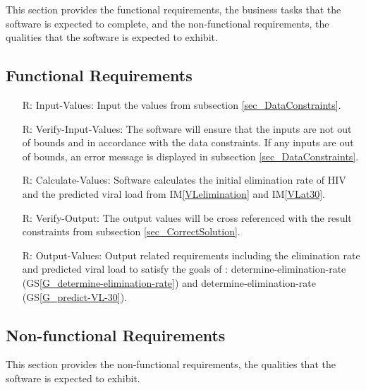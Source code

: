 \documentclass[12pt]{article}
\newcommand{\iref}[1]{IM\ref{#1}}
\newcounter{reqnum} %
\begin{document}
This section provides the functional requirements, the business tasks that the
software is expected to complete, and the non-functional requirements, the
qualities that the software is expected to exhibit.

\subsection{Functional Requirements}
\label{sec_FunctionalReq}

\noindent \begin{itemize}

\item[R\refstepcounter{reqnum}\thereqnum \label{R_Inputs}:]Input-Values: Input 
the values from subsection
 \ref{sec_DataConstraints}.

\item[R\refstepcounter{reqnum}\thereqnum \label{R_VerifyInputs}:] 
Verify-Input-Values: The software will ensure that the inputs are not out of 
bounds and in accordance with the data constraints. If any inputs are out of 
bounds, an error message is displayed in subsection \ref{sec_DataConstraints}.
    
\item[R\refstepcounter{reqnum}\thereqnum \label{R_Calculate}:] 
Calculate-Values: Software calculates the initial elimination rate of HIV and 
the predicted viral 
load from \iref{VLelimination} and 
\iref{VLat30}.

\item[R\refstepcounter{reqnum}\thereqnum \label{R_VerifyOutput}:]
Verify-Output: The output values will be cross referenced with the result 
constraints from subsection \ref{sec_CorrectSolution}.

\item[R\refstepcounter{reqnum}\thereqnum \label{R_Output}:] 
Output-Values: Output related requirements including the elimination rate and 
predicted viral load to satisfy the goals of \progname{}: 
determine-elimination-rate (GS\ref{G_determine-elimination-rate}) and 
determine-elimination-rate (GS\ref{G_predict-VL-30}).

\end{itemize}


\subsection{Non-functional Requirements}

This section provides the non-functional requirements, the qualities that the 
software is expected to exhibit.
\end{document}
